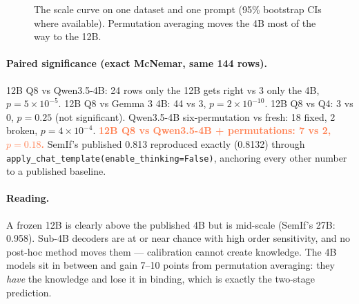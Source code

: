 \documentclass[11pt,a4paper]{article}
\newcommand{\code}[1]{\texttt{#1}}
\newcommand{\hl}[1]{\textcolor{coral}{\textbf{#1}}}
\begin{document}
\begin{figure}[H]
\centering
{}
\caption{The scale curve on one dataset and one prompt (95\% bootstrap CIs where available). Permutation averaging moves the 4B most of the way to the 12B.}
\label{fig:scale}
\end{figure}

\paragraph{Paired significance (exact McNemar, same 144 rows).} 12B Q8 vs Qwen3.5-4B: 24 rows only the 12B gets right vs 3 only the 4B, $p=5\times10^{-5}$. 12B Q8 vs Gemma 3 4B: 44 vs 3, $p=2\times10^{-10}$. 12B Q8 vs Q4: 3 vs 0, $p=0.25$ (not significant). Qwen3.5-4B six-permutation vs fresh: 18 fixed, 2 broken, $p=4\times10^{-4}$. \hl{12B Q8 vs Qwen3.5-4B + permutations: 7 vs 2, $p=0.18$.} SemIf's published 0.813 reproduced exactly (0.8132) through \code{apply\_chat\_template(enable\_thinking=False)}, anchoring every other number to a published baseline.

\paragraph{Reading.} A frozen 12B is clearly above the published 4B but is mid-scale (SemIf's 27B: 0.958). Sub-4B decoders are at or near chance with high order sensitivity, and no post-hoc method moves them --- calibration cannot create knowledge. The 4B models sit in between and gain 7--10 points from permutation averaging: they \emph{have} the knowledge and lose it in binding, which is exactly the two-stage prediction.
\end{document}
